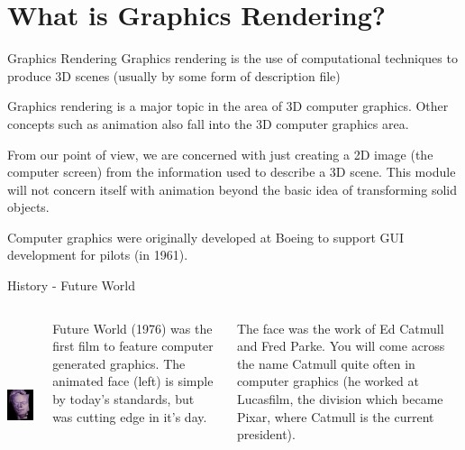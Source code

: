 \documentclass[handout,18pt]{beamer}
\begin{document}
\section{What is Graphics Rendering?}

\begin{frame}{Graphics Rendering}
\pause
Graphics rendering is the use of computational techniques to \\
produce 3D scenes (usually by some form of description file)
\pause        

\vspace{11pt}
Graphics rendering is a major topic in the area of 3D computer graphics.  Other concepts such as animation also fall into the 3D computer graphics area.
\pause

\vspace{11pt}
From our point of view, we are concerned with just creating a 2D image (the computer screen) from the information used to describe a 3D scene.  This module will not concern itself with animation beyond the basic idea of transforming solid objects.
\pause

\vspace{11pt}
Computer graphics were originally developed at Boeing to support GUI development for pilots (in 1961). 
\end{frame}

\begin{frame}{History - Future World}
\begin{columns}
\centering
\includegraphics[height=5cm]{futureworld.jpg}

\vspace{20pt}
Future World (1976) was the first film to feature computer generated graphics.  The animated face (left) is simple by today's standards, but was cutting edge in it's day.

\vspace{11pt}
The face was the work of Ed Catmull and Fred Parke.  You will come across the name Catmull quite often in computer graphics (he worked at Lucasfilm, the division which became Pixar, where Catmull is the current president).
\end{columns}
\end{frame}
\end{document}
